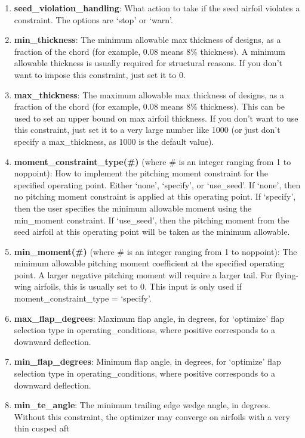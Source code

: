 \documentclass[11pt]{article}
\begin{document}
\begin{enumerate}
\item{\textbf{seed\_violation\_handling}: What action to take if the seed airfoil violates
a constraint.  The options are `stop' or `warn'.}
\item{\textbf{min\_thickness}: The minimum allowable max thickness of designs, as a
fraction of the chord (for example, 0.08 means 8\% thickness).  A minimum allowable
thickness is usually required for structural reasons.  If you don't want to impose this
constraint, just set it to 0.}
\item{\textbf{max\_thickness}: The maximum allowable max thickness of designs, as a
fraction of the chord (for example, 0.08 means 8\% thickness). This can be used to set an
upper bound on max airfoil thickness.  If you don't want to use this constraint, just set
it to a very large number like 1000 (or just don't specify a max\_thickness, as 1000 is
the default value).}
\item{\textbf{moment\_constraint\_type(\#)} (where \# is an integer ranging from 1 to
noppoint): How to implement the pitching moment constraint for the specified operating
point. Either `none', `specify', or `use\_seed'.  If `none', then no pitching moment 
constraint is applied at this operating point.  If `specify', then the user specifies the 
minimum allowable moment using the min\_moment constraint.  If `use\_seed', then the 
pitching moment from the seed airfoil at this operating point will be taken as the minimum
allowable.}
\item{\textbf{min\_moment(\#)} (where \# is an integer ranging from 1 to noppoint): The 
minimum allowable pitching moment coefficient at the specified operating point.  A larger
negative pitching moment will require a larger tail.  For flying-wing airfoils, this is 
usually set to 0.  This input is only used if moment\_constraint\_type = `specify'.} 
\item{\textbf{max\_flap\_degrees}: Maximum flap angle, in degrees, for `optimize' flap 
selection type in operating\_conditions, where positive corresponds to a downward
deflection.}
\item{\textbf{min\_flap\_degrees}: Minimum flap angle, in degrees, for `optimize' flap 
selection type in operating\_conditions, where positive corresponds to a downward
deflection.}
\item{\textbf{min\_te\_angle}: The minimum trailing edge wedge angle, in degrees.  Without
this constraint, the optimizer may converge on airfoils with a very thin cusped aft
}
\end{enumerate}
\end{document}
